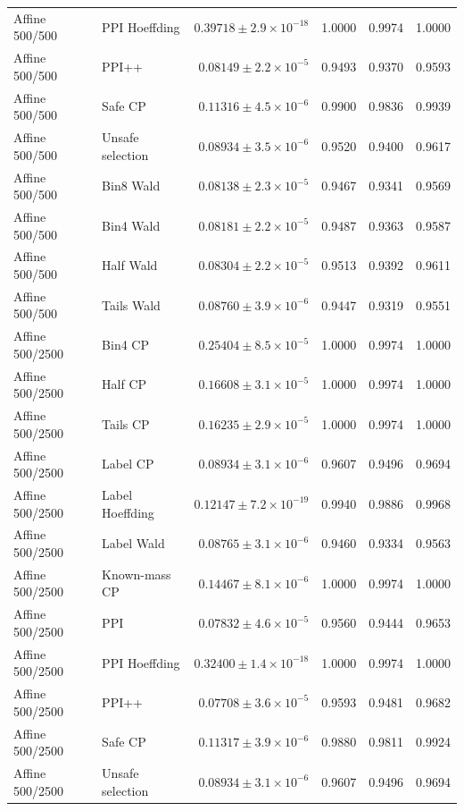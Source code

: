 \begin{longtable}{llrrrr}
Affine 500/500 & PPI Hoeffding & $0.39718\pm 2.9\times 10^{-18}$ & 1.0000 & 0.9974 & 1.0000 \\
Affine 500/500 & PPI++ & $0.08149\pm 2.2\times 10^{-5}$ & 0.9493 & 0.9370 & 0.9593 \\
Affine 500/500 & Safe CP & $0.11316\pm 4.5\times 10^{-6}$ & 0.9900 & 0.9836 & 0.9939 \\
Affine 500/500 & Unsafe selection & $0.08934\pm 3.5\times 10^{-6}$ & 0.9520 & 0.9400 & 0.9617 \\
Affine 500/500 & Bin8 Wald & $0.08138\pm 2.3\times 10^{-5}$ & 0.9467 & 0.9341 & 0.9569 \\
Affine 500/500 & Bin4 Wald & $0.08181\pm 2.2\times 10^{-5}$ & 0.9487 & 0.9363 & 0.9587 \\
Affine 500/500 & Half Wald & $0.08304\pm 2.2\times 10^{-5}$ & 0.9513 & 0.9392 & 0.9611 \\
Affine 500/500 & Tails Wald & $0.08760\pm 3.9\times 10^{-6}$ & 0.9447 & 0.9319 & 0.9551 \\
Affine 500/2500 & Bin4 CP & $0.25404\pm 8.5\times 10^{-5}$ & 1.0000 & 0.9974 & 1.0000 \\
Affine 500/2500 & Half CP & $0.16608\pm 3.1\times 10^{-5}$ & 1.0000 & 0.9974 & 1.0000 \\
Affine 500/2500 & Tails CP & $0.16235\pm 2.9\times 10^{-5}$ & 1.0000 & 0.9974 & 1.0000 \\
Affine 500/2500 & Label CP & $0.08934\pm 3.1\times 10^{-6}$ & 0.9607 & 0.9496 & 0.9694 \\
Affine 500/2500 & Label Hoeffding & $0.12147\pm 7.2\times 10^{-19}$ & 0.9940 & 0.9886 & 0.9968 \\
Affine 500/2500 & Label Wald & $0.08765\pm 3.1\times 10^{-6}$ & 0.9460 & 0.9334 & 0.9563 \\
Affine 500/2500 & Known-mass CP & $0.14467\pm 8.1\times 10^{-6}$ & 1.0000 & 0.9974 & 1.0000 \\
Affine 500/2500 & PPI & $0.07832\pm 4.6\times 10^{-5}$ & 0.9560 & 0.9444 & 0.9653 \\
Affine 500/2500 & PPI Hoeffding & $0.32400\pm 1.4\times 10^{-18}$ & 1.0000 & 0.9974 & 1.0000 \\
Affine 500/2500 & PPI++ & $0.07708\pm 3.6\times 10^{-5}$ & 0.9593 & 0.9481 & 0.9682 \\
Affine 500/2500 & Safe CP & $0.11317\pm 3.9\times 10^{-6}$ & 0.9880 & 0.9811 & 0.9924 \\
Affine 500/2500 & Unsafe selection & $0.08934\pm 3.1\times 10^{-6}$ & 0.9607 & 0.9496 & 0.9694 \\

\end{longtable}
